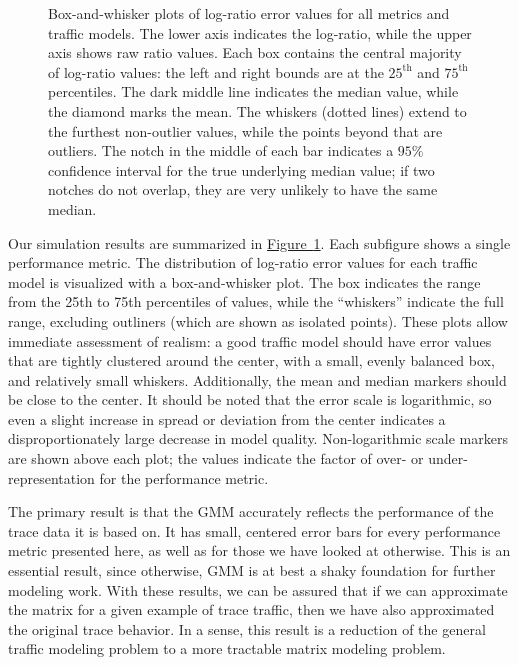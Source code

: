 \documentclass[twocolumn,final]{svjour3}
\newcommand{\caps}[1]{{\small{#1}}}
\newcommand{\Figure}[1]{\hyperref[fig:#1]{Figure~\ref*{fig:#1}}}
\begin{document}
\begin{figure}
%
%
\caption{\footnotesize%
Box-and-whisker plots of log-ratio error values for all metrics and traffic models. The lower axis indicates the log-ratio, while the upper axis shows raw ratio values. Each box contains the central majority of log-ratio values: the left and right bounds are at the $25^\text{th}$ and $75^\text{th}$ percentiles. The dark middle line indicates the median value, while the diamond marks the mean. The whiskers (dotted lines) extend to the furthest non-outlier values, while the points beyond that are outliers. The notch in the middle of each bar indicates a $95\%$ confidence interval for the true underlying median value; if two notches do not overlap, they are very unlikely to have the same median.
}
\label{fig:box-plots}
\end{figure}

Our simulation results are summarized in \Figure{box-plots}. Each subfigure shows a single performance metric. The distribution of log-ratio error values for each traffic model is visualized with a box-and-whisker plot. The box indicates the range from the 25th to 75th percentiles of values, while the ``whiskers'' indicate the full range, excluding outliners (which are shown as isolated points). These plots allow immediate assessment of realism: a good traffic model should have error values that are tightly clustered around the center, with a small, evenly balanced box, and relatively small whiskers. Additionally, the mean and median markers should be close to the center. It should be noted that the error scale is logarithmic, so even a slight increase in spread or deviation from the center indicates a disproportionately large decrease in model quality. Non-logarithmic scale markers are shown above each plot; the values indicate the factor of over- or under-representation for the performance metric.

The primary result is that the \caps{GMM} accurately reflects the performance of the trace data it is based on. It has small, centered error bars for every performance metric presented here, as well as for those we have looked at otherwise. This is an essential result, since otherwise, \caps{GMM} is at best a shaky foundation for further modeling work. With these results, we can be assured that if we can approximate the matrix for a given example of trace traffic, then we have also approximated the original trace behavior. In a sense, this result is a reduction of the general traffic modeling problem to a more tractable matrix modeling problem.
\end{document}
